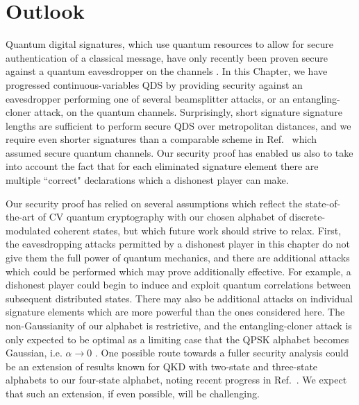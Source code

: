 \clearpage
\section{Outlook}
Quantum digital signatures, which use quantum resources to allow for secure authentication of a classical message, have only recently been proven secure against a quantum eavesdropper on the channels \cite{Amiri2016, Puthoor2016, Yin2016}. In this Chapter, we have progressed continuous-variables QDS by providing security against an eavesdropper performing one of several beamsplitter attacks, or an entangling-cloner attack, on the quantum channels. Surprisingly, short signature signature lengths are sufficient to perform secure QDS over metropolitan distances, and we require even shorter signatures than a comparable scheme in Ref.~\cite{Croal2016} which assumed secure quantum channels. Our security proof has enabled us also to take into account the fact that for each eliminated signature element there are multiple ``correct" declarations which a dishonest player can make.

Our security proof has relied on several assumptions which reflect the state-of-the-art of CV quantum cryptography with our chosen alphabet of discrete-modulated coherent states, but which future work should strive to relax. First, the eavesdropping attacks permitted by a dishonest player in this chapter do not give them the full power of quantum mechanics, and there are additional attacks which could be performed which may prove additionally effective. For example, a dishonest player could begin to induce and exploit quantum correlations between subsequent distributed states. There may also be additional attacks on individual signature elements which are more powerful than the ones considered here. The non-Gaussianity of our alphabet is restrictive, and the entangling-cloner attack is only expected to be optimal as a limiting case that the QPSK alphabet becomes Gaussian, i.e. $\alpha \rightarrow 0$ \cite{Navascues2006, Garcia-Patron2006}. One possible route towards a fuller security analysis could be an extension of results known for QKD with two-state \cite{Zhao2009} and three-state \cite{Bradler2018} alphabets to our four-state alphabet, noting recent progress in Ref.~\cite{Papanastasiou2018}. We expect that such an extension, if even possible, will be challenging.

